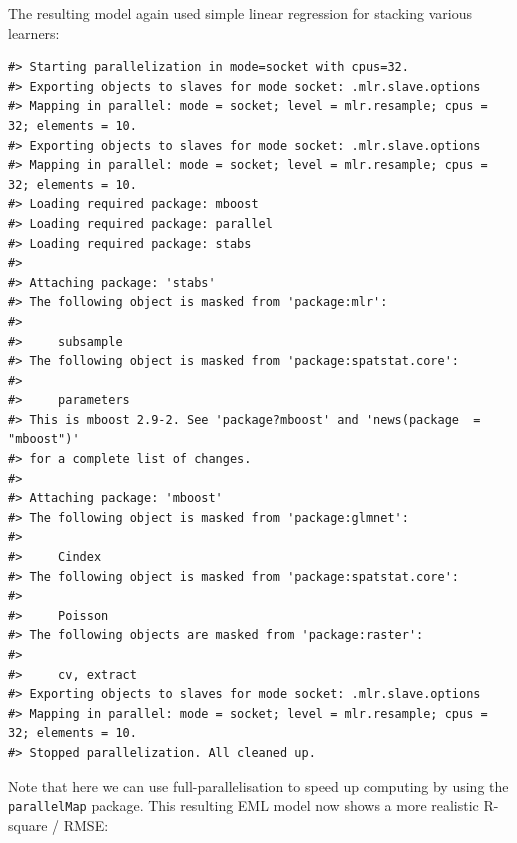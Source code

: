 \documentclass[
  graybox,natbib,nospthms]{svmono}
\begin{document}
The resulting model again used simple linear regression for stacking
various learners:

\begin{verbatim}
#> Starting parallelization in mode=socket with cpus=32.
#> Exporting objects to slaves for mode socket: .mlr.slave.options
#> Mapping in parallel: mode = socket; level = mlr.resample; cpus = 32; elements = 10.
#> Exporting objects to slaves for mode socket: .mlr.slave.options
#> Mapping in parallel: mode = socket; level = mlr.resample; cpus = 32; elements = 10.
#> Loading required package: mboost
#> Loading required package: parallel
#> Loading required package: stabs
#> 
#> Attaching package: 'stabs'
#> The following object is masked from 'package:mlr':
#> 
#>     subsample
#> The following object is masked from 'package:spatstat.core':
#> 
#>     parameters
#> This is mboost 2.9-2. See 'package?mboost' and 'news(package  = "mboost")'
#> for a complete list of changes.
#> 
#> Attaching package: 'mboost'
#> The following object is masked from 'package:glmnet':
#> 
#>     Cindex
#> The following object is masked from 'package:spatstat.core':
#> 
#>     Poisson
#> The following objects are masked from 'package:raster':
#> 
#>     cv, extract
#> Exporting objects to slaves for mode socket: .mlr.slave.options
#> Mapping in parallel: mode = socket; level = mlr.resample; cpus = 32; elements = 10.
#> Stopped parallelization. All cleaned up.
\end{verbatim}

Note that here we can use full-parallelisation to speed up computing by
using the \texttt{parallelMap} package. This resulting EML model now shows a
more realistic R-square / RMSE:
\end{document}
